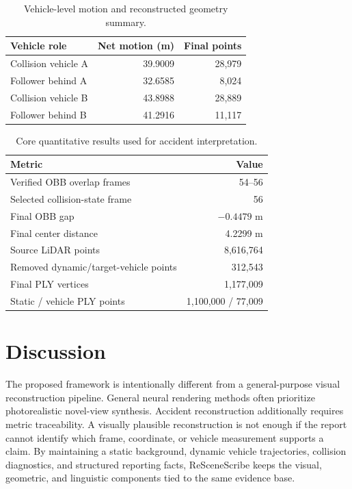 \documentclass[conference]{IEEEtran}
\begin{document}
\begin{table}[t]
\centering
\footnotesize
\caption{Vehicle-level motion and reconstructed geometry summary.}
\label{tab:vehicle}
\begin{tabular}{lrr}
\toprule
Vehicle role & Net motion (m) & Final points \\
\midrule
Collision vehicle A & 39.9009 & 28,979 \\
Follower behind A & 32.6585 & 8,024 \\
Collision vehicle B & 43.8988 & 28,889 \\
Follower behind B & 41.2916 & 11,117 \\
\bottomrule
\end{tabular}
\end{table}

\begin{table}[t]
\centering
\footnotesize
\caption{Core quantitative results used for accident interpretation.}
\label{tab:results}
\begin{tabular}{lr}
\toprule
Metric & Value \\
\midrule
Verified OBB overlap frames & 54--56 \\
Selected collision-state frame & 56 \\
Final OBB gap & $-0.4479$ m \\
Final center distance & 4.2299 m \\
Source LiDAR points & 8,616,764 \\
Removed dynamic/target-vehicle points & 312,543 \\
Final PLY vertices & 1,177,009 \\
Static / vehicle PLY points & 1,100,000 / 77,009 \\
\bottomrule
\end{tabular}
\end{table}

\section{Discussion}

The proposed framework is intentionally different from a general-purpose visual
reconstruction pipeline. General neural rendering methods often prioritize
photorealistic novel-view synthesis. Accident reconstruction additionally
requires metric traceability. A visually plausible reconstruction is not enough
if the report cannot identify which frame, coordinate, or vehicle measurement
supports a claim. By maintaining a static background, dynamic vehicle
trajectories, collision diagnostics, and structured reporting facts,
ReSceneScribe keeps the visual, geometric, and linguistic components tied to
the same evidence base.
\end{document}
